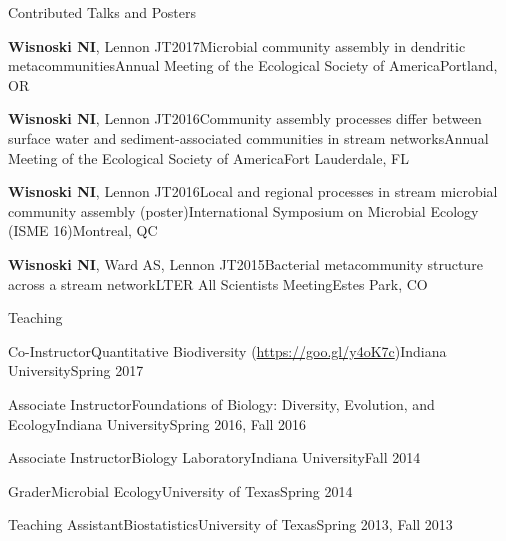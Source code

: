 \documentclass{resume} %
\begin{document}
\begin{rSection}{Contributed Talks and Posters}

  \begin{Presentation}{{\bf Wisnoski NI}, Lennon JT}{2017}{Microbial community assembly in dendritic metacommunities}{Annual Meeting of the Ecological Society of America}{Portland, OR}
  \end{Presentation}

  \begin{Presentation}{{\bf Wisnoski NI}, Lennon JT}{2016}{Community assembly processes differ between surface water and sediment-associated communities in stream networks}{Annual Meeting of the Ecological Society of America}{Fort Lauderdale, FL}
  \end{Presentation}

  \begin{Presentation}{{\bf Wisnoski NI}, Lennon JT}{2016}{Local and regional processes in stream microbial community assembly (poster)}{International Symposium on Microbial Ecology (ISME 16)}{Montreal, QC}
  \end{Presentation}

  \begin{Presentation}{{\bf Wisnoski NI}, Ward AS, Lennon JT}{2015}{Bacterial metacommunity structure across a stream network}{LTER All Scientists Meeting}{Estes Park, CO}
  \end{Presentation}

\end{rSection}


\begin{rSection}{Teaching}

\begin{Course}
  {Co-Instructor}{Quantitative Biodiversity (\url{https://goo.gl/y4oK7c})}{Indiana University}{Spring 2017}
\end{Course}

\begin{Course}
  {Associate Instructor}{Foundations of Biology: Diversity, Evolution, and Ecology}{Indiana University}{Spring 2016, Fall 2016}
\end{Course}

\begin{Course}
  {Associate Instructor}{Biology Laboratory}{Indiana University}{Fall 2014}
\end{Course}

\begin{Course}
  {Grader}{Microbial Ecology}{University of Texas}{Spring 2014}
\end{Course}

\begin{Course}
  {Teaching Assistant}{Biostatistics}{University of Texas}{Spring 2013, Fall 2013}
\end{Course}

\end{rSection}
\end{document}
